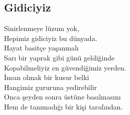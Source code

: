 \subsection{Gidiciyiz}

Sinirlenmeye lüzum yok, \\
Hepimiz gidiciyiz bu dünyada. \\
Hayat basitçe yaşanmalı \\
Sarı bir yaprak gibi günü geldiğinde \\
Kopabilmeliyiz en güvendiğimiz yerden. \\
İnsan olmak bir kusur belki \\
Hangimiz gururuna yedirebilir \\
Onca şeyden sonra üstüne basılmasını \\
Hem de tanımadığı bir kişi tarafından.